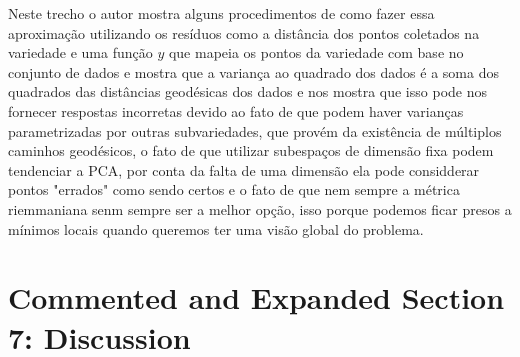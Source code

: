 \documentclass[a4paper,titlepage]{article}
\begin{document}
{
\vspace{1em}
\centering
{}
\vspace{1em}
}

Neste trecho o autor mostra alguns procedimentos de como fazer essa aproximação utilizando os resíduos como a distância dos pontos coletados na variedade e uma função $y$ que mapeia os pontos da variedade com base no conjunto de dados e mostra que a variança ao quadrado dos dados é a soma dos quadrados das distâncias geodésicas dos dados e nos mostra que isso pode nos fornecer respostas incorretas devido ao fato de que podem haver varianças parametrizadas por outras subvariedades, que provém da existência de múltiplos caminhos geodésicos, o fato de que utilizar subespaços de dimensão fixa podem tendenciar a PCA, por conta da falta de uma dimensão ela pode considderar pontos "errados" como sendo certos e o fato de que nem sempre a métrica riemmaniana senm sempre ser a melhor opção, isso porque podemos ficar presos a mínimos locais quando queremos ter uma visão global do problema.

\section{Commented and Expanded Section 7: Discussion}\label{sec:discussion}
\end{document}
